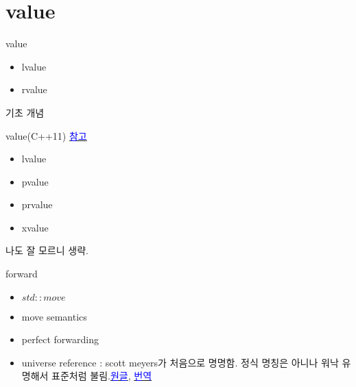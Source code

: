 \documentclass[10pt]{beamer}
\begin{document}
\section{value}

\begin{frame}{value}
    \begin{itemize}
        \item lvalue
        \item rvalue
    \end{itemize}
\end{frame}


\begin{frame}[fragile]{기초 개념}
    
\end{frame}

\begin{frame}{value(C++11)}
    \href{https://en.cppreference.com/w/cpp/language/value_category}{\textcolor{blue}{참고}}
    
    \begin{itemize}
        \item lvalue
        \item pvalue
        \item prvalue
        \item xvalue
    \end{itemize}

    나도 잘 모르니 생략.
\end{frame}


\begin{frame}{forward}
    \begin{itemize}
        \item $std::move$
        \item move semantics
        \item perfect forwarding
        \item universe reference : scott meyers가 처음으로 명명함. 정식 명칭은 아니나 워낙 유명해서 표준처럼 불림.\href{https://isocpp.org/blog/2012/11/universal-references-in-c11-scott-meyers}{\textcolor{blue}{원글}}, \href{http://egloos.zum.com/sweeper/v/3149089}{\textcolor{blue}{번역}}
        
    \end{itemize}
\end{frame}
\end{document}
